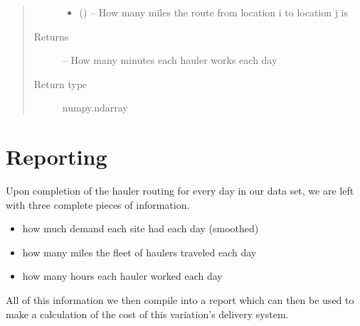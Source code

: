 \documentclass[letterpaper,10pt,english]{sphinxmanual}
\begin{document}
\begin{fulllineitems}
\begin{quote}
\begin{description}
\begin{itemize}
\item {} 
 () -- How many miles the route from location i to location j is

\end{itemize}

\item[{Returns}] \leavevmode
{} -- How many minutes each hauler works each day

\item[{Return type}] \leavevmode
numpy.ndarray

\end{description}\end{quote}

\end{fulllineitems}



\chapter{Reporting}
\label{\detokenize{reporting:reporting}}\label{\detokenize{reporting::doc}}\label{\detokenize{reporting:id1}}
Upon completion of the hauler routing for every day in our data set, we are
left with three complete pieces of information.
\begin{itemize}
\item {} 
how much demand each site had each day (smoothed)

\item {} 
how many miles the fleet of haulers traveled each day

\item {} 
how many hours each hauler worked each day

\end{itemize}

All of this information we then compile into a report which can then be used
to make a calculation of the cost of this variation's delivery system.
\end{document}

